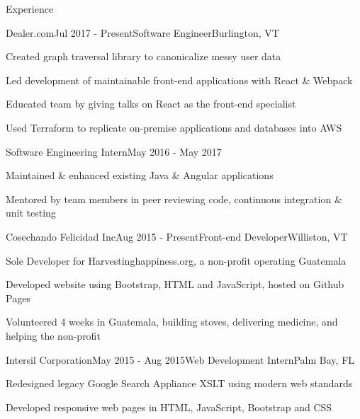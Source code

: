 \documentclass{resume} %
\begin{document}

\begin{rSection}{Experience}


\begin{rSubsection}{Dealer.com}{Jul 2017 - Present}{Software Engineer}{Burlington, VT}
    \item Created graph traversal library to canonicalize messy user data
    \item Led development of maintainable front-end applications with React \& Webpack
    \item Educated team by giving talks on React as the front-end specialist
    \item Used Terraform to replicate on-premise applications and databases into AWS
\end{rSubsection}

\begin{sSubsection}{Software Engineering Intern}{May 2016 - May 2017}
    \item Maintained \& enhanced existing Java \& Angular applications
    \item Mentored by team members in peer reviewing code, continuous integration \& unit testing
\end{sSubsection}


\begin{rSubsection}{Cosechando Felicidad Inc}{Aug 2015 - Present}{Front-end Developer}{Williston, VT}
    \item Sole Developer for Harvestinghappiness.org, a non-profit operating Guatemala
    \item Developed website using Bootstrap, HTML and JavaScript, hosted on Github Pages
    \item Volunteered 4 weeks in Guatemala, building stoves, delivering medicine, and helping the non-profit
\end{rSubsection}


\begin{rSubsection}{Intersil Corporation}{May 2015 - Aug 2015}{Web Development Intern}{Palm Bay, FL}
    \item Redesigned legacy Google Search Appliance XSLT using modern web standards
    \item Developed responsive web pages in HTML, JavaScript, Bootstrap and CSS
\end{rSubsection}


\end{rSection}
\end{document}
